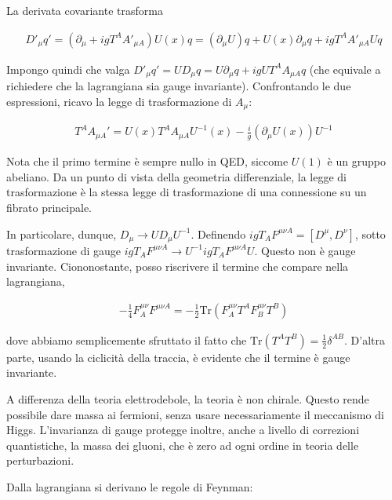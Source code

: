 \documentclass[11pt]{report}
\begin{document}
La derivata covariante trasforma 

\begin{align}
    D'_\mu q' = (\partial_\mu + igT^A A'_{\mu A})U(x)q = (\partial_\mu U)q + U(x)\partial_\mu q + igT^A A'_{\mu A} U q 
\end{align}

Impongo quindi che valga \(D'_\mu q' = UD_\mu q = U\partial_\mu q + igU T^A A_{\mu A}q\) (che equivale a richiedere che la lagrangiana sia gauge invariante). Confrontando le due espressioni, ricavo la legge di trasformazione di \(A_\mu\): 

\begin{align}
    T^A A_{\mu A}' = U(x)T^A A_{\mu A}U^{-1}(x) - \frac{i}{g}(\partial_\mu U(x))U^{-1}
\end{align}

Nota che il primo termine è sempre nullo in QED, siccome \(U(1)\) è un gruppo abeliano. Da un punto di vista della geometria differenziale, la legge di trasformazione è la stessa legge di trasformazione di una connessione su un fibrato principale. 

In particolare, dunque, \(D_\mu \to U D_\mu U^{-1}\). Definendo \(igT_A F^{\mu\nu A} = [D^\mu, D^\nu]\), sotto trasformazione di gauge \(ig T_A F^{\mu\nu A} \to U^{-1}igT_A F^{\mu\nu A} U\). Questo non è gauge invariante. Ciononostante, posso riscrivere il termine che compare nella lagrangiana, 

\begin{align}
    -\frac{1}{4}F^{\mu\nu}_A F^{\mu\nu A} = -\frac{1}{2}\text{Tr}(F^{\mu\nu}_A T^A F^{\mu\nu}_B T^B)
\end{align}

dove abbiamo semplicemente sfruttato il fatto che \(\text{Tr}(T^A T^B) = \frac{1}{2}\delta^{AB}\). D'altra parte, usando la ciclicità della traccia, è evidente che il termine è gauge invariante. 

A differenza della teoria elettrodebole, la teoria è non chirale. Questo rende possibile dare massa ai fermioni, senza usare necessariamente il meccanismo di Higgs. L'invarianza di gauge protegge inoltre, anche a livello di correzioni quantistiche, la massa dei gluoni, che è zero ad ogni ordine in teoria delle perturbazioni. 

Dalla lagrangiana si derivano le regole di Feynman: 
\end{document}
